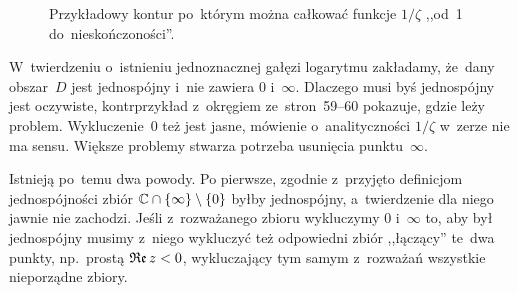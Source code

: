 \documentclass[a4paper,11pt]{article}
\begin{document}
\begin{figure}
  \centering


  \caption{Przykładowy kontur po~którym można całkować funkcje
    $1 / \zeta$ ,,od~1 do~nieskończoności''.}

  \label{fig:Leja-02}
\end{figure}



\start {} W~twierdzeniu o~istnieniu jednoznacznej gałęzi
logarytmu zakładamy, że~dany obszar~$D$ jest jednospójny i~nie zawiera
$0$ i~$\infty$. Dlaczego musi byś jednospójny jest oczywiste,
kontrprzykład z~okręgiem ze~stron~59--60 pokazuje, gdzie leży problem.
Wykluczenie~$0$ też jest jasne, mówienie o~analityczności $1 / \zeta$
w~zerze nie ma sensu. Większe problemy stwarza potrzeba usunięcia
punktu~$\infty$.

Istnieją po~temu dwa powody. Po pierwsze, zgodnie z~przyjęto
definicjom jednospójności zbiór
$\mathbb{C} \cap \{  \infty  \} \setminus \{  0  \}$ byłby jednospójny,
a~twierdzenie dla niego jawnie nie zachodzi. Jeśli z~rozważanego
zbioru wykluczymy $0$ i~$\infty$ to, aby był jednospójny musimy
z~niego wykluczyć też odpowiedni zbiór ,,łączący'' te~dwa punkty,
np.~prostą $\mathfrak{Re}\, z < 0$, wykluczający tym samym z~rozważań
wszystkie nieporządne zbiory.
\end{document}
